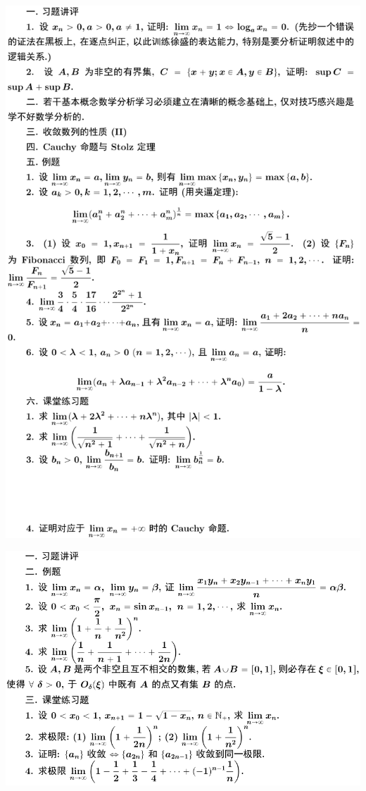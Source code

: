 \documentclass[11pt,a4paper]{ctexart}
\begin{document}
\begin{paracol}{2}
\includegraphics[width=\linewidth]{figure14.png}
\newpage
{}

\includegraphics[width=\linewidth]{figure15.png}
\newpage
{}


\end{paracol}
\end{document}
